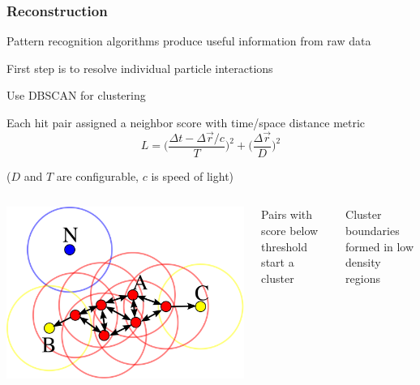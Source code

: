 \documentclass[10pt,professionalfonts,xcolor=table]{beamer}
\begin{document}
\begin{frame}

\frametitle{Reconstruction}

\bangon
\item Pattern recognition algorithms produce useful information from raw data
\gap
\item First step is to resolve individual particle interactions
\gap
\item Use DBSCAN for clustering
\gap
\item Each hit pair assigned a neighbor score with time/space distance metric
\begin{equation*}
L = \bigg( \frac{\Delta t - \Delta \vec{r} / c }{T} \bigg)^2 +
     \bigg( \frac{\Delta \vec{r}}{D} \bigg)^2
\end{equation*}
\begin{center}
 ($D$ and $T$ are configurable, $c$ is speed of light)
\end{center}
\bangoff

\begin{columns}[c]

\centering

\includegraphics[width=\textwidth]{figures/figures/dbscan.png}

\bangon
\gap
\item Pairs with score below threshold start a cluster
\gap
\item Cluster boundaries formed in low density regions

\bangoff

\end{columns}

\end{frame}
\end{document}
